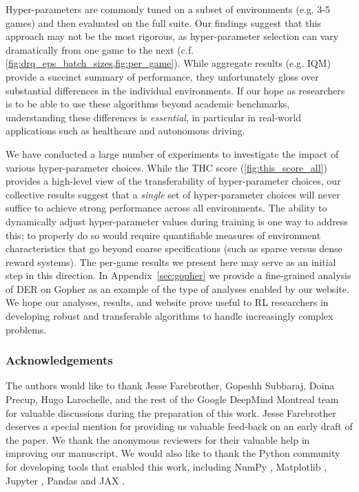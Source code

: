 \documentclass[10pt]{article} %
\begin{document}
Hyper-parameters are commonly tuned on a subset of environments (e.g. 3-5 games) and then evaluated on the full suite. Our findings suggest that this approach may not be the most rigorous, as hyper-parameter selection can vary dramatically from one game to the next (c.f. \cref{fig:drq_eps_batch_sizes,fig:per_game}).
While aggregate results (e.g. IQM) provide a succinct summary of performance, they unfortunately gloss over substantial differences in the individual environments. If our hope as researchers is to be able to use these algorithms beyond academic benchmarks, understanding these differences is {\em essential}, in particular in real-world applications such as healthcare and autonomous driving.

We have conducted a large number of experiments to investigate the impact of various hyper-parameter choices. While the THC score (\autoref{fig:this_score_all}) provides a high-level view of the transferability of hyper-parameter choices, our collective results suggest that a {\em single} set of hyper-parameter choices will never suffice to achieve strong performance across all environments. The ability to dynamically adjust hyper-parameter values during training is one way to address this; to properly do so would require quantifiable measures of environment characteristics that go beyond coarse specifications (such as sparse versus dense reward systems). The per-game results we present here may serve as an initial step in this direction. In Appendix~\ref{sec:gopher} we provide a fine-grained analysis of DER on Gopher as an example of the type of analyses enabled by our website. We hope our analyses, results, and website prove useful to RL researchers in developing robust and  transferable algorithms to handle increasingly complex problems.\\

\subsubsection*{Acknowledgements}

The authors would like to thank Jesse Farebrother, Gopeshh Subbaraj, Doina Precup, Hugo Larochelle, and the rest of the Google DeepMind Montreal team for valuable discussions during the preparation of this work.  Jesse Farebrother deserves a special mention for providing us valuable feed-back on an early draft of the paper. We thank the anonymous reviewers for their valuable help in improving our manuscript. We would also like to thank the Python community \cite{van1995python, 4160250} for developing tools that enabled this work, including NumPy \cite{harris2020array}, Matplotlib \cite{hunter2007matplotlib}, Jupyter \cite{2016ppap}, Pandas \cite{McKinney2013Python} and JAX \cite{bradbury2018jax}.
\end{document}

